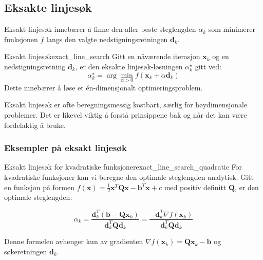 \subsection{Eksakte linjesøk}
\label{subsec:exact_line_search}

Eksakt linjesøk innebærer å finne den aller beste steglengden \(\alpha_k\) som minimerer funksjonen \(f\) langs den valgte nedstigningsretningen \(\symbf{d}_k\).

\begin{definition}{Eksakt linjesøk}{exact_line_search}
	Gitt en nåværende iterasjon \(\symbf{x}_k\) og en nedstigningsretning \(\symbf{d}_k\), er den eksakte linjesøk-løsningen \(\alpha_k^\star\) gitt ved:
	\[
		\alpha_k^\star = \arg\min_{\alpha > 0} f(\symbf{x}_k + \alpha \symbf{d}_k)
	\]
	Dette innebærer å løse et én-dimensjonalt optimeringsproblem.
\end{definition}
Eksakt linjesøk er ofte beregningsmessig kostbart, særlig for høydimensjonale problemer. Det er likevel viktig å forstå prinsippene bak og når det kan være fordelaktig å bruke.

\subsubsection{Eksempler på eksakt linjesøk}
\label{subsubsec:exact_line_search_examples}

\begin{example}{Eksakt linjesøk for kvadratiske funksjoner}{exact_line_search_quadratic}
	For kvadratiske funksjoner kan vi beregne den optimale steglengden analytisk. Gitt en funksjon på formen
	$f(\symbf{x}) = \frac{1}{2}\symbf{x}^T\symbf{Q}\symbf{x} - \symbf{b}^T\symbf{x} + c$ med positiv definitt $\symbf{Q}$,
	er den optimale steglengden:

	\begin{equation*}
		\alpha_k = \frac{\symbf{d}_k^T(\symbf{b} - \symbf{Q}\symbf{x}_k)}{\symbf{d}_k^T\symbf{Q}\symbf{d}_k} = \frac{-\symbf{d}_k^T\nabla f(\symbf{x}_k)}{\symbf{d}_k^T\symbf{Q}\symbf{d}_k}
	\end{equation*}

	Denne formelen avhenger kun av gradienten $\nabla f(\symbf{x}_k) = \symbf{Q}\symbf{x}_k - \symbf{b}$ og
	søkeretningen $\symbf{d}_k$.

	\begin{center}
	\end{center}
\end{example}



